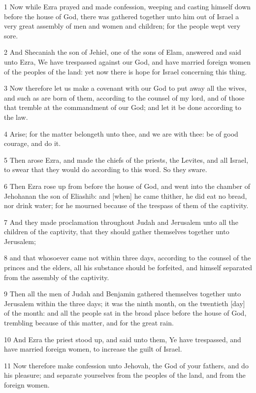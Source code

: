 \par 1 Now while Ezra prayed and made confession, weeping and casting himself down before the house of God, there was gathered together unto him out of Israel a very great assembly of men and women and children; for the people wept very sore.
\par 2 And Shecaniah the son of Jehiel, one of the sons of Elam, answered and said unto Ezra, We have trespassed against our God, and have married foreign women of the peoples of the land: yet now there is hope for Israel concerning this thing.
\par 3 Now therefore let us make a covenant with our God to put away all the wives, and such as are born of them, according to the counsel of my lord, and of those that tremble at the commandment of our God; and let it be done according to the law.
\par 4 Arise; for the matter belongeth unto thee, and we are with thee: be of good courage, and do it.
\par 5 Then arose Ezra, and made the chiefs of the priests, the Levites, and all Israel, to swear that they would do according to this word. So they sware.
\par 6 Then Ezra rose up from before the house of God, and went into the chamber of Jehohanan the son of Eliashib: and [when] he came thither, he did eat no bread, nor drink water; for he mourned because of the trespass of them of the captivity.
\par 7 And they made proclamation throughout Judah and Jerusalem unto all the children of the captivity, that they should gather themselves together unto Jerusalem;
\par 8 and that whosoever came not within three days, according to the counsel of the princes and the elders, all his substance should be forfeited, and himself separated from the assembly of the captivity.
\par 9 Then all the men of Judah and Benjamin gathered themselves together unto Jerusalem within the three days; it was the ninth month, on the twentieth [day] of the month: and all the people sat in the broad place before the house of God, trembling because of this matter, and for the great rain.
\par 10 And Ezra the priest stood up, and said unto them, Ye have trespassed, and have married foreign women, to increase the guilt of Israel.
\par 11 Now therefore make confession unto Jehovah, the God of your fathers, and do his pleasure; and separate yourselves from the peoples of the land, and from the foreign women.

